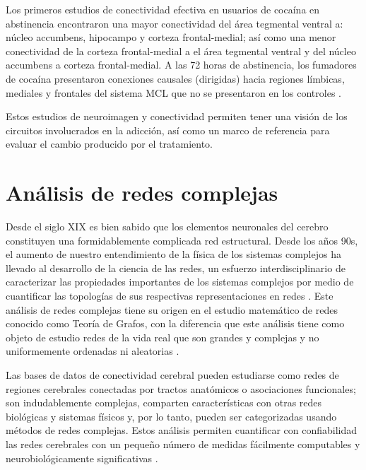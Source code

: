 Los primeros estudios de conectividad efectiva en usuarios de cocaína en abstinencia encontraron una mayor conectividad del área tegmental ventral a: núcleo accumbens, hipocampo y corteza frontal-medial; así como una menor conectividad de la corteza frontal-medial a el área tegmental ventral y del núcleo accumbens a corteza frontal-medial.
A las 72 horas de abstinencia, los fumadores de cocaína presentaron conexiones causales (dirigidas) hacia regiones límbicas, mediales y frontales del sistema MCL que no se presentaron en los controles \parencite{Ray2017,Ray2016}.\par
Estos estudios de neuroimagen y conectividad permiten tener una visión de los circuitos involucrados en la adicción, así como un marco de referencia para evaluar el cambio producido por el tratamiento.

\section{Análisis de redes complejas}
Desde el siglo XIX es bien sabido que los elementos neuronales del cerebro constituyen una formidablemente complicada red estructural.
Desde los años 90s, el aumento de nuestro entendimiento de la física de los sistemas complejos ha llevado al desarrollo de la ciencia de las redes, un esfuerzo interdisciplinario de caracterizar las propiedades importantes de los sistemas complejos por medio de cuantificar las topologías de sus respectivas representaciones en redes \parencite{Bullmore2009a,Rubinov2010}.
Este análisis de redes complejas tiene su origen en el estudio matemático de redes conocido como Teoría de Grafos, con la diferencia que este análisis tiene como objeto de estudio redes de la vida real que son grandes y complejas y no uniformemente ordenadas ni aleatorias \parencite{Rubinov2010}.\par
Las bases de datos de conectividad cerebral pueden estudiarse como redes de regiones cerebrales conectadas por tractos anatómicos o asociaciones funcionales;
son indudablemente complejas, comparten características con otras redes biológicas y sistemas físicos y, por lo tanto, pueden ser categorizadas usando métodos de redes complejas.
Estos análisis permiten cuantificar con confiabilidad las redes cerebrales con un pequeño número de medidas fácilmente computables y neurobiológicamente significativas \parencite{Humphries2008,Latora2001,Achard2007}. \par

